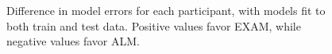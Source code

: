 \documentclass[
  12pt,
  letterpaper,
]{article}
\begin{document}
\begin{figure}


\caption{\label{fig-htw-best-model}Difference in model errors for each
participant, with models fit to both train and test data. Positive
values favor EXAM, while negative values favor ALM.}

\end{figure}%
\end{document}
